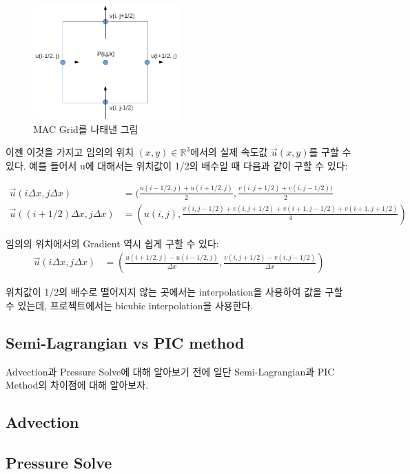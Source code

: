 \documentclass[10pt, A4]{article}
\begin{document}
\begin{figure}[h]
\centering
\includegraphics[width=0.5\textwidth]{mac_grid}
\caption{MAC Grid를 나태낸 그림}
\end{figure}

이젠 이것을 가지고 임의의 위치 $(x, y) \in \mathbb{R}^3$에서의 실제 속도값 $\vec{u}(x, y)$를 구할 수 있다. 예를 들어서 u에 대해서는 위치값이 1/2의 배수일 때 다음과 같이 구할 수 있다:

\begin{align*} 
  \vec{u}(i \Delta x, j \Delta x) &= (\frac{u(i-1/2, j) + u(i+1/2, j)}{2}, \frac{v(i,j+1/2) + v(i,j-1/2))}{2} \\
  \vec{u}((i+1/2) \Delta x, j \Delta x) &= (u(i,j), \frac{v(i,j-1/2) + v(i,j+1/2) + v(i+1,j-1/2) + v(i+1,j+1/2)}{4})
\end{align*}

임의의 위치에서의 Gradient 역시 쉽게 구할 수 있다:
\begin{align*}
  \vec{u}(i \Delta x, j \Delta x) &= (\frac{u(i+1/2, j) - u(i-1/2, j)}{\Delta x}, \frac{v(i,j+1/2) - v(i,j-1/2)}{\Delta x})
\end{align*}

위치값이 1/2의 배수로 떨어지지 않는 곳에서는 interpolation을 사용하여 값을 구할 수 있는데, 프로젝트에서는 bicubic interpolation을 사용한다.

\subsection{Semi-Lagrangian vs PIC method}

Advection과 Pressure Solve에 대해 알아보기 전에 일단 Semi-Lagrangian과 PIC Method의 차이점에 대해 알아보자.

\subsection{Advection}

\subsection{Pressure Solve}
\end{document}
